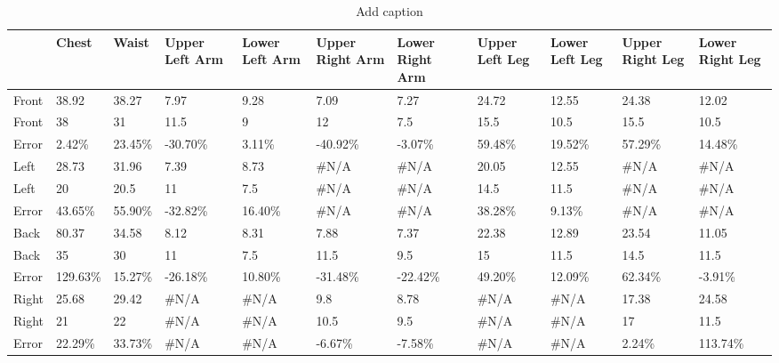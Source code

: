 \begin{table}[htbp]
	\centering
	\caption{Add caption}
	\begin{tabularx}{\textwidth}{|X|X|X|X|X|X|X|X|X|X|X|}
		\toprule
		& Chest & Waist & Upper Left Arm & Lower Left Arm & Upper Right Arm & Lower Right Arm & Upper Left Leg & Lower Left Leg & Upper Right Leg & Lower Right Leg \\
		\midrule
		\rowcolor[rgb]{ .573,  .816,  .314} Front & 38.92 & 38.27 & 7.97  & 9.28  & 7.09  & 7.27  & 24.72 & 12.55 & 24.38 & 12.02 \\
		\midrule
		\rowcolor[rgb]{ 0,  .69,  .941} Front & 38    & 31    & 11.5  & 9     & 12    & 7.5   & 15.5  & 10.5  & 15.5  & 10.5 \\
		\midrule
		Error & 2.42\% & 23.45\% & -30.70\% & 3.11\% & -40.92\% & -3.07\% & 59.48\% & 19.52\% & 57.29\% & 14.48\% \\
		\midrule
		\rowcolor[rgb]{ .573,  .816,  .314} Left  & 28.73 & 31.96 & 7.39  & 8.73  & \#N/A & \#N/A & 20.05 & 12.55 & \#N/A & \#N/A \\
		\midrule
		\rowcolor[rgb]{ 0,  .69,  .941} Left  & 20    & 20.5  & 11    & 7.5   & \#N/A & \#N/A & 14.5  & 11.5  & \#N/A & \#N/A \\
		\midrule
		Error & 43.65\% & 55.90\% & -32.82\% & 16.40\% & \#N/A & \#N/A & 38.28\% & 9.13\% & \#N/A & \#N/A \\
		\midrule
		\rowcolor[rgb]{ .573,  .816,  .314} Back  & 80.37 & 34.58 & 8.12  & 8.31  & 7.88  & 7.37  & 22.38 & 12.89 & 23.54 & 11.05 \\
		\midrule
		\rowcolor[rgb]{ 0,  .69,  .941} Back  & 35    & 30    & 11    & 7.5   & 11.5  & 9.5   & 15    & 11.5  & 14.5  & 11.5 \\
		\midrule
		Error & 129.63\% & 15.27\% & -26.18\% & 10.80\% & -31.48\% & -22.42\% & 49.20\% & 12.09\% & 62.34\% & -3.91\% \\
		\midrule
		\rowcolor[rgb]{ .573,  .816,  .314} Right & 25.68 & 29.42 & \#N/A & \#N/A & 9.8   & 8.78  & \#N/A & \#N/A & 17.38 & 24.58 \\
		\midrule
		\rowcolor[rgb]{ 0,  .69,  .941} Right & 21    & 22    & \#N/A & \#N/A & 10.5  & 9.5   & \#N/A & \#N/A & 17    & 11.5 \\
		\midrule
		Error & 22.29\% & 33.73\% & \#N/A & \#N/A & -6.67\% & -7.58\% & \#N/A & \#N/A & 2.24\% & 113.74\% \\
		\bottomrule
	\end{tabularx}%
	\label{tab:testTable}%
\end{table}%
